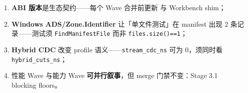 \begin{philobox}
\begin{enumerate}[nosep]
  \item \textbf{ABI 版本}是生态契约——每个 Wave 合并前更新  与 Workbench shim；
  \item \textbf{Windows ADS/Zone.Identifier} 让「单文件测试」在 manifest 出现 2 条记录——测试须 \texttt{FindManifestFile} 而非 \texttt{files.size()==1}；
  \item \textbf{Hybrid CDC} 改变 profile 语义——\texttt{stream\_cdc\_ns} 可为 0，须同时看 \texttt{hybrid\_cuts\_ns}；
  \item 性能 Wave 与能力 Wave \textbf{可并行叙事}，但 merge 门禁不变：Stage 3.1 blocking floors。
\end{enumerate}
\end{philobox}
